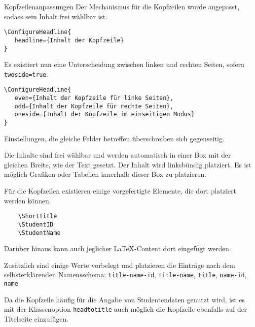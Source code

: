 \documentclass[
	ngerman,
	]{tudaexercise}
\let\code\texttt
\begin{document}
\begin{task}{Kopfzeilenanpassungen}
Der Mechanismus für die Kopfzeilen wurde angepasst, sodass sein Inhalt frei wählbar ist.

\begin{verbatim}
\ConfigureHeadline{
   headline={Inhalt der Kopfzeile}
}
\end{verbatim}

Es existiert nun eine Unterscheidung zwischen linken und rechten Seiten, sofern \code{twoside=true}.

\begin{verbatim}
\ConfigureHeadline{
   even={Inhalt der Kopfzeile für linke Seiten},
   odd={Inhalt der Kopfzeile für rechte Seiten},
   oneside={Inhalt der Kopfzeile im einseitigen Modus}
}
\end{verbatim}

Einstellungen, die gleiche Felder betreffen überschreiben sich gegenseitig.

\begin{subtask}
Die Inhalte sind frei wählbar und werden automatisch in einer Box mit der gleichen Breite, wie der Text gesetzt. Der Inhalt wird linksbündig platziert. Es ist möglich Grafiken oder Tabellen innerhalb dieser Box zu platzieren.
\end{subtask}

\begin{subtask}
Für die Kopfzeilen existieren  einige vorgefertigte Elemente, die dort platziert werden können.
\begin{verbatim}
	\ShortTitle
	\StudentID
	\StudentName
\end{verbatim}
Darüber hinaus kann auch jeglicher \LaTeX-Content dort eingefügt werden.

Zusätzlich sind einige Werte vorbelegt und platzieren die Einträge nach dem selbsterklärenden Namensschema:
\code{title-name-id}, \code{title-name}, \code{title}, \code{name-id}, \code{name}
\end{subtask}

\begin{subtask}
Da die Kopfzeile häufig für die Angabe von Studentendaten genutzt wird, ist es mit der Klassenoption \code{headtotitle} auch möglich die Kopfzeile ebenfalls auf der Titelseite einzufügen.
\end{subtask}
\end{task}
\end{document}
